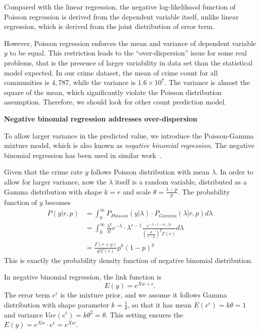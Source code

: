 Compared with the linear regression, the negative log-likelihood function of Poisson regression is derived from the dependent variable itself, unlike linear regression, which is derived from the joint distribution of error term. 


However, Poisson regression enforces the mean and variance of dependent variable $y$ to be equal. This restriction leads to the ``over-dispersion'' issue for some real problems, that is the presence of larger variability in data set than the statistical model expected. In our crime dataset, the mean of crime count for all communities is $4,787$, while the variance is $1.6 \times 10^7$. The variance is almost the square of the mean, which significantly violate the Poisson distribution assumption. Therefore, we should look for other count prediction model.




\textbf{Negative binomial regression addresses over-dispersion}

To allow larger variance in the predicted value,  we introduce the Poisson-Gamma mixture model, which is also known as \emph{negative binomial regression}.  The negative binomial regression has been used in similar work~\cite{Osg00}.




Given that the crime rate $y$ follows Poisson distribution with mean $\lambda$.  In order to allow for larger variance, now the $\lambda$ itself is a random variable, distributed as a Gamma distribution with shape $k=r$ and scale $\theta = \frac{1-p}{p}$.  The probability function of $y$ becomes
\begin{align}
P(y| r, p) & = \int_0^{\infty} P_{Poisson}(y|\lambda) \cdot P_{Gamma}(\lambda|r, p) d \lambda \nonumber \\ 
		& = \int_0^{\infty} \frac{\lambda^y}{y!} e^{-\lambda} \cdot \lambda^{r-1} \frac{e^{-\lambda(1-p)/p}}{(\frac{p}{1-p})^y \Gamma(r)} d\lambda  \nonumber \\
		& = \frac{\Gamma(r+y)}{y! \Gamma(r)} p^k (1-p)^y
\end{align}
This is exactly the probability density function of negative binomial distribution.


In negative binomial regression, the link function is
\begin{equation}
E(y) = e^{X w + \epsilon}.
\end{equation}
The error term $e^\epsilon$ is the mixture prior, and we assume it follows Gamma distribution with shape parameter $k=\frac{1}{\theta}$, so that it has mean $E(e^\epsilon) = k\theta = 1$ and variance $Var(e^\epsilon) = k\theta^2 = \theta$. This setting ensures the $E(y) = e^{Xw} \cdot e^\epsilon = e^{Xw}$.





